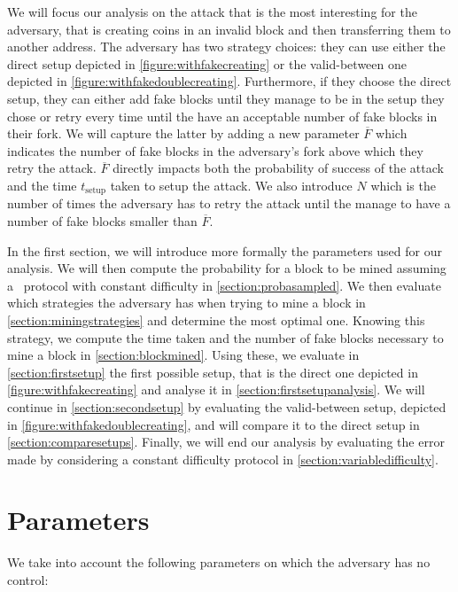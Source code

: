 We will focus our analysis on the attack that is the most interesting for the adversary, that is creating coins in an invalid block and then transferring them to another address. The adversary has two strategy choices: they can use either the direct setup depicted in \autoref{figure:withfakecreating} or the valid-between one depicted in \autoref{figure:withfakedoublecreating}. Furthermore, if they choose the direct setup, they can either add fake blocks until they manage to be in the setup they chose or retry every time until the have an acceptable number of fake blocks in their fork. We will capture the latter by adding a new parameter \(\overline{F}\) which indicates the number of fake blocks in the adversary's fork above which they retry the attack. \(\overline{F}\) directly impacts both the probability of success of the attack and the time \(t_{\text{setup}}\) taken to setup the attack. We also introduce \(N\) which is the number of times the adversary has to retry the attack until the manage to have a number of fake blocks smaller than \(\overline{F}\).

In the first section, we will introduce more formally the parameters used for our analysis. We will then compute the probability for a block to be mined assuming a \FC\ protocol with constant difficulty in \autoref{section:probasampled}. We then evaluate which strategies the adversary has when trying to mine a block in \autoref{section:miningstrategies} and determine the most optimal one. Knowing this strategy, we compute the time taken and the number of fake blocks necessary to mine a block in \autoref{section:blockmined}. Using these, we evaluate in \autoref{section:firstsetup} the first possible setup, that is the direct one depicted in \autoref{figure:withfakecreating} and analyse it in \autoref{section:firstsetupanalysis}. We will continue in \autoref{section:secondsetup} by evaluating the valid-between setup, depicted in \autoref{figure:withfakedoublecreating}, and will compare it to the direct setup in \autoref{section:comparesetups}. Finally, we will end our analysis by evaluating the error made by considering a constant difficulty protocol in \autoref{section:variabledifficulty}.

\section{Parameters}

We take into account the following parameters on which the adversary has no control:

